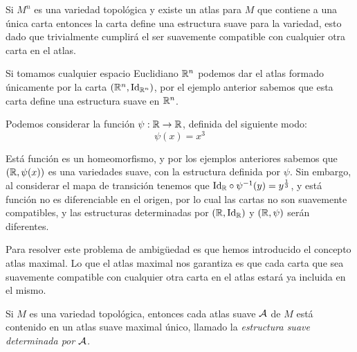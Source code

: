 \begin{example}\label{Ex: Variedad Suave - Carta Unica}
	Si $M^n$ es una variedad topológica y existe un atlas para $M$ que contiene a una única carta entonces la carta define una estructura suave para la variedad, esto dado que trivialmente cumplirá el ser suavemente compatible con cualquier otra carta en el atlas.
\end{example}


\begin{example}\label{Ex: Variedad Suave - Espacios Euclidianos}
	Si tomamos cualquier espacio Euclidiano $\mathbb{R}^n$ podemos dar el atlas formado únicamente por la carta $(\mathbb{R}^n,\mathrm{Id}_{\mathbb{R}^n})$, por el ejemplo anterior sabemos que esta carta define una estructura suave en $\mathbb{R}^n$.
\end{example}

\begin{example} %
	Podemos considerar la función $\psi: \mathbb{R} \to \mathbb{R}$, definida del siguiente modo:
	\[
		\psi(x) = x^3
	\]

	Está función es un homeomorfismo, y por los ejemplos anteriores sabemos que $(\mathbb{R}, \psi(x))$ es una variedades suave, con la estructura definida por  $\psi$. Sin embargo, al considerar el mapa de transición tenemos que $\mathrm{Id}_{\mathbb{R}} \circ \psi^{-1}(y) = y^{\frac{1}{3}}$, y está función no es diferenciable en el origen, por lo cual las cartas no son suavemente compatibles, y las estructuras determinadas por $(\mathbb{R}, \mathrm{Id}_{\mathbb{R}})$ y $(\mathbb{R},\psi)$ serán diferentes.

\end{example}

Para resolver este problema de ambigüedad es que hemos introducido el concepto atlas maximal. Lo que el atlas maximal nos garantiza es que cada carta que sea suavemente compatible con cualquier otra carta en el atlas estará ya incluida en el mismo.

\begin{theorem}
	Si $M$ es una variedad topológica, entonces cada atlas suave $\mathcal{A}$ de $M$ está contenido en un atlas suave maximal único, llamado la \it{estructura suave determinada por $\mathcal{A}$}.
\end{theorem}

